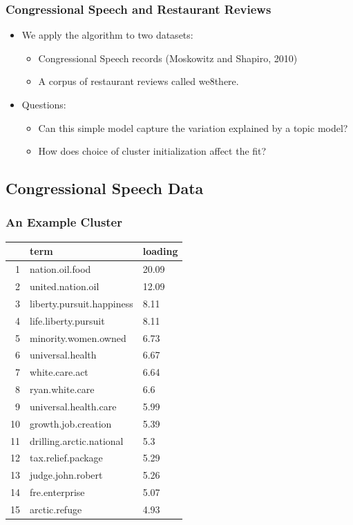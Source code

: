 \documentclass{beamer}
\begin{document}
\begin{frame}
\frametitle{Congressional Speech and Restaurant Reviews}
\begin{itemize}
\item We apply the algorithm to two datasets:
	\begin{itemize} 
	\item Congressional Speech records (Moskowitz and Shapiro, 2010) 
	\item A corpus of restaurant reviews called we8there.
	\end{itemize}
\item Questions:
	\begin{itemize}
	\item Can this simple model capture the variation explained by a topic model?
	\item How does choice of cluster initialization affect the fit? 
	\end{itemize}
\end{itemize}
\end{frame}


\subsection{Congressional Speech Data}

\begin{frame}
\frametitle{An Example Cluster}
\begin{center}
\small
\begin{tabular}{rll}
  \hline
 & term & loading \\ 
  \hline
1 & nation.oil.food & 20.09 \\ 
  2 & united.nation.oil & 12.09 \\ 
  3 & liberty.pursuit.happiness & 8.11 \\ 
  4 & life.liberty.pursuit & 8.11 \\ 
  5 & minority.women.owned & 6.73 \\ 
  6 & universal.health & 6.67 \\ 
  7 & white.care.act & 6.64 \\ 
  8 & ryan.white.care & 6.6 \\ 
  9 & universal.health.care & 5.99 \\ 
  10 & growth.job.creation & 5.39 \\ 
  11 & drilling.arctic.national & 5.3 \\ 
  12 & tax.relief.package & 5.29 \\ 
  13 & judge.john.robert & 5.26 \\ 
  14 & fre.enterprise & 5.07 \\ 
  15 & arctic.refuge & 4.93 \\ 
   \hline
\end{tabular}
\end{center}
\end{frame}
\end{document}
